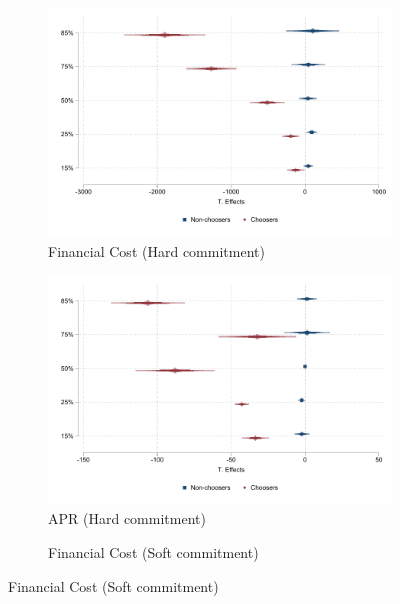 \documentclass[oneside,11pt]{article}
\begin{document}
\begin{figure}[H]
    \caption{Non-experimental analysis of Choosers and Non-Choosers}
    \label{qreg_chooser_nonchooser}
    \begin{center}
    \begin{subfigure}{.45\textwidth}
      \caption{Financial Cost (Hard commitment)}
        \centering
        \includegraphics[width=\textwidth]{Figuras/qreg_hard_fc_admin.pdf}
    \end{subfigure}
     \begin{subfigure}{0.45\textwidth}
      \caption{APR (Hard commitment)}
       \centering
      \includegraphics[width=\textwidth]{Figuras/qreg_hard_apr.pdf}
    \end{subfigure}
    \begin{subfigure}{.45\textwidth}
      \caption{Financial Cost (Soft commitment)}
        \centering

\end{subfigure}
\end{center}
\end{figure}
\end{document}
